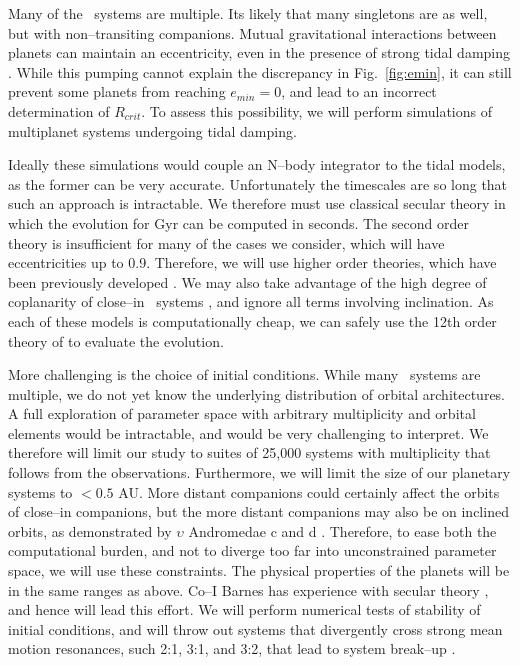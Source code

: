 Many of the \kepler~systems are multiple.  Its likely that many
singletons are as well, but with non--transiting companions.  Mutual
gravitational interactions between planets can maintain an
eccentricity, even in the presence of strong tidal damping
\citep{MardlingLin02,GreenbergVanLAerhoven11,Correia12}.  While this
pumping cannot explain the discrepancy in Fig.~\ref{fig:emin}, it can
still prevent some planets from reaching $e_{min} = 0$, and lead to an
incorrect determination of $R_{crit}$.  To assess this possibility, we
will perform simulations of multiplanet systems undergoing tidal
damping.

Ideally these simulations would couple an N--body integrator to the
tidal models, as the former can be very accurate.  Unfortunately the
timescales are so long that such an approach is intractable.  We
therefore must use classical secular theory in which the evolution for
Gyr can be computed in seconds.  The second order theory is
insufficient for many of the cases we consider, which will have
eccentricities up to 0.9.  Therefore, we will use higher order
theories, which have been previously developed
\citep[e.g.][]{Ford00,VerasArmitage04,LibertHenrard06}.  We may also
take advantage of the high degree of coplanarity of close--in
\kepler~systems \cite{Fabrycky12}, and ignore all terms involving
inclination.  As each of these models is computationally cheap, we can
safely use the 12th order theory of \cite{LibertHenrard} to evaluate
the evolution.  

More challenging is the choice of initial conditions.  While many
\kepler~systems are multiple, we do not yet know the underlying
distribution of orbital architectures.  A full exploration of
parameter space with arbitrary multiplicity and orbital elements would
be intractable, and would be very challenging to interpret.  We
therefore will limit our study to suites of 25,000 systems with
multiplicity that follows from the observations.  Furthermore, we will
limit the size of our planetary systems to $<0.5$ AU.  More distant
companions could certainly affect the orbits of close--in companions,
but the more distant companions may also be on inclined orbits, as
demonstrated by $\upsilon$ Andromedae c and d
\citep{McArthur10,ReffertQuirrenbach11}.  Therefore, to ease both the
computational burden, and not to diverge too far into unconstrained
parameter space, we will use these constraints.  The physical
properties of the planets will be in the same ranges as above.  Co--I
Barnes has experience with secular theory
\citep{BarnesGreenberg06a,BarnesGreenberg06b}, and hence will lead
this effort.  We will perform numerical tests of stability of initial
conditions, and will throw out systems that divergently cross strong
mean motion resonances, such 2:1, 3:1, and 3:2, that lead to system
break--up \citep[e.g.][]{Gomes05}.

